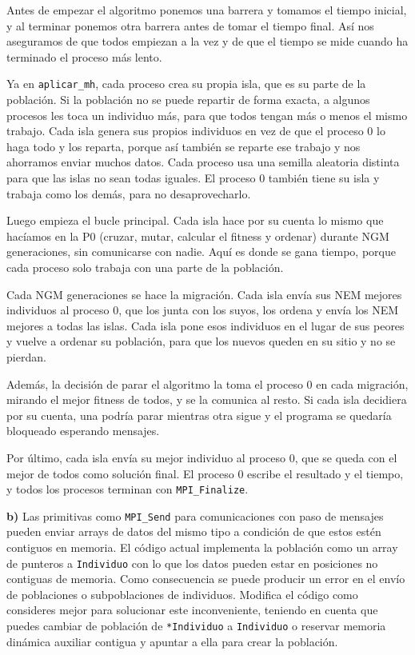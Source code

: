 \documentclass[12pt]{article}
\begin{document}
\begin{enumerate}
Antes de empezar el algoritmo ponemos una barrera y tomamos el tiempo inicial, y al terminar ponemos otra barrera antes de tomar el tiempo final. Así nos aseguramos de que todos empiezan a la vez y de que el tiempo se mide cuando ha terminado el proceso más lento.
 
Ya en \texttt{aplicar\_mh}, cada proceso crea su propia isla, que es su parte de la población. Si la población no se puede repartir de forma exacta, a algunos procesos les toca un individuo más, para que todos tengan más o menos el mismo trabajo. Cada isla genera sus propios individuos en vez de que el proceso 0 lo haga todo y los reparta, porque así también se reparte ese trabajo y nos ahorramos enviar muchos datos. Cada proceso usa una semilla aleatoria distinta para que las islas no sean todas iguales. El proceso 0 también tiene su isla y trabaja como los demás, para no desaprovecharlo.
 
Luego empieza el bucle principal. Cada isla hace por su cuenta lo mismo que hacíamos en la P0 (cruzar, mutar, calcular el fitness y ordenar) durante NGM generaciones, sin comunicarse con nadie. Aquí es donde se gana tiempo, porque cada proceso solo trabaja con una parte de la población.
 
Cada NGM generaciones se hace la migración. Cada isla envía sus NEM mejores individuos al proceso 0, que los junta con los suyos, los ordena y envía los NEM mejores a todas las islas. Cada isla pone esos individuos en el lugar de sus peores y vuelve a ordenar su población, para que los nuevos queden en su sitio y no se pierdan.
 
Además, la decisión de parar el algoritmo la toma el proceso 0 en cada migración, mirando el mejor fitness de todos, y se la comunica al resto. Si cada isla decidiera por su cuenta, una podría parar mientras otra sigue y el programa se quedaría bloqueado esperando mensajes.
 
Por último, cada isla envía su mejor individuo al proceso 0, que se queda con el mejor de todos como solución final. El proceso 0 escribe el resultado y el tiempo, y todos los procesos terminan con \texttt{MPI\_Finalize}.
 
 


\vspace{0.5cm}

\textbf{b)} Las primitivas como \texttt{MPI\_Send} para comunicaciones con paso de mensajes pueden enviar arrays de datos del mismo tipo a condición de que estos estén contiguos en memoria. El código actual implementa la población como un array de punteros a \texttt{Individuo} con lo que los datos pueden estar en posiciones no contiguas de memoria. Como consecuencia se puede producir un error en el envío de poblaciones o subpoblaciones de individuos. Modifica el código como consideres mejor para solucionar este inconveniente, teniendo en cuenta que puedes cambiar de población de \texttt{*Individuo} a \texttt{Individuo} o reservar memoria dinámica auxiliar contigua y apuntar a ella para crear la población.


\end{enumerate}
\end{document}
